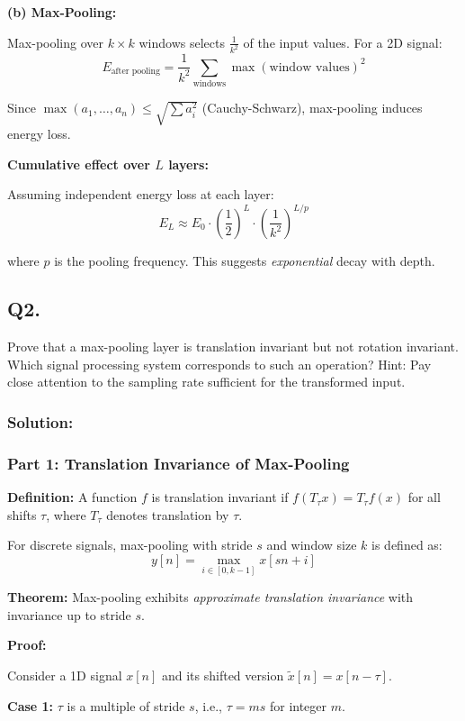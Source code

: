 \documentclass[12pt]{article}
\begin{document}
\textbf{(b) Max-Pooling:}

Max-pooling over $k \times k$ windows selects $\frac{1}{k^2}$ of the input values. For a 2D signal:
$$
E_{\text{after pooling}} = \frac{1}{k^2} \sum_{\text{windows}} \max(\text{window values})^2
$$

Since $\max(a_1, \ldots, a_n) \leq \sqrt{\sum a_i^2}$ (Cauchy-Schwarz), max-pooling induces energy loss.

\textbf{Cumulative effect over $L$ layers:}

Assuming independent energy loss at each layer:
$$
E_L \approx E_0 \cdot \left(\frac{1}{2}\right)^L \cdot \left(\frac{1}{k^2}\right)^{L/p}
$$

where $p$ is the pooling frequency. This suggests \textit{exponential} decay with depth.

\subsection{Q2.}
Prove that a max-pooling layer is translation invariant but not rotation invariant. Which signal processing system corresponds to such an operation? Hint: Pay close attention to the sampling rate sufficient for the transformed input.

\subsubsection*{Solution:}

\subsubsection*{Part 1: Translation Invariance of Max-Pooling}

\textbf{Definition:} A function $f$ is translation invariant if $f(T_{\tau} x) = T_{\tau} f(x)$ for all shifts $\tau$, where $T_{\tau}$ denotes translation by $\tau$.

For discrete signals, max-pooling with stride $s$ and window size $k$ is defined as:
$$
y[n] = \max_{i \in [0, k-1]} x[sn + i]
$$

\textbf{Theorem:} Max-pooling exhibits \textit{approximate translation invariance} with invariance up to stride $s$.

\textbf{Proof:}

Consider a 1D signal $x[n]$ and its shifted version $\tilde{x}[n] = x[n - \tau]$.

\textbf{Case 1:} $\tau$ is a multiple of stride $s$, i.e., $\tau = ms$ for integer $m$.
\end{document}
